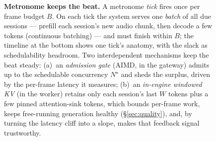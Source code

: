 \begin{figure}[t]
{\begin{tikzpicture}
\end{tikzpicture}}
\caption{\textbf{Metronome keeps the beat.} A metronome \emph{tick} fires once per frame budget $B$. On
each tick the system serves one \emph{batch} of all due sessions --- prefill each session's new audio
chunk, then decode a few tokens (continuous batching) --- and must finish within $B$; the timeline at the
bottom shows one tick's anatomy, with the slack as schedulability headroom. Two interdependent mechanisms
keep the beat steady: (a)~an \emph{admission gate} (AIMD, in the gateway) admits up to the schedulable
concurrency $N^\star$ and sheds the surplus, driven by the per-frame latency it measures; (b)~an
\emph{in-engine windowed KV} (in the worker) retains only each session's last $W$ tokens plus a few
pinned attention-sink tokens, which bounds per-frame work, keeps free-running generation healthy
(\S\ref{sec:quality}), and, by turning the latency cliff into a slope, makes that feedback signal
trustworthy.}
\label{fig:arch}
\end{figure}
